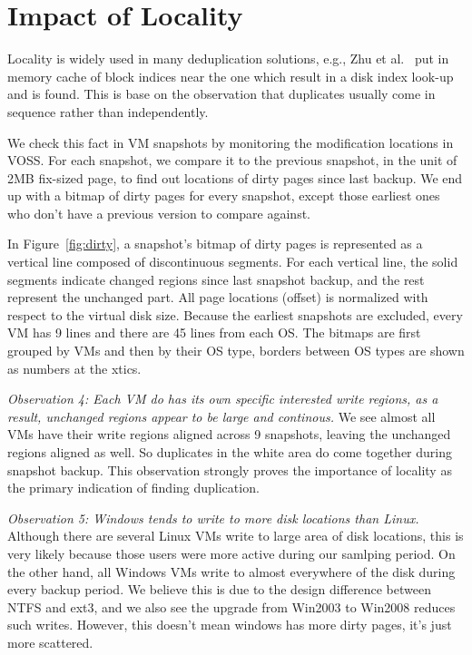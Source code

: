 \section{Impact of Locality}
Locality is widely used in many deduplication solutions, e.g., Zhu et al.~\cite{bottleneck08}
put in memory cache of block indices near the one which result in a disk index look-up and is found.
This is base on the observation that duplicates usually come in sequence rather than independently.

We check this fact in VM snapshots by monitoring the modification locations in VOSS. 
For each snapshot, we compare it to the previous snapshot, in the unit of 2MB fix-sized page,
to find out locations of dirty pages since last backup. We end up with a bitmap of
dirty pages for every snapshot, except those earliest ones who don't have a previous version
to compare against.

\begin{figure*}[htb]
  \centering
\caption{Bitmaps of dirty pages between snapshots}
\label{fig:dirty}
\end{figure*}

In Figure~\ref{fig:dirty}, a snapshot's bitmap of dirty pages is represented as a vertical line 
composed of discontinuous segments. 
For each vertical line, the solid segments indicate changed regions since last snapshot backup,
and the rest represent the unchanged part.
All page locations (offset) is normalized with respect to the virtual disk size.
Because the earliest snapshots are excluded, 
every VM has 9 lines and there are 45 lines from each OS.
The bitmaps are first grouped by VMs and then by their OS type,
borders between OS types are shown as numbers at the xtics.

\emph{Observation 4: Each VM do has its own specific interested write regions, as a result, 
unchanged regions appear to be large and continous.} We see almost all VMs have
their write regions aligned across 9 snapshots, leaving the unchanged regions aligned as well.
So duplicates in the white area do come together during snapshot backup.
This observation strongly proves the importance of locality as the primary indication of
finding duplication.

\emph{Observation 5: Windows tends to write to more disk locations than Linux.} 
Although there are several Linux VMs write to large area of disk locations, this is very likely
because those users were more active during our samlping period.
On the other hand, all Windows VMs write to almost everywhere of the disk during every backup period.
We believe this is due to the design difference between NTFS and ext3, and we also see
the upgrade from Win2003 to Win2008 reduces such writes. However, this doesn't mean windows has more 
dirty pages, it's just more scattered.


